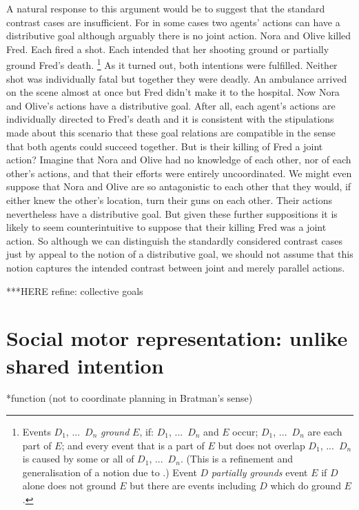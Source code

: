 \documentclass[12pt,\papersize]{extarticle}
\begin{document}
A natural response to this argument would be to suggest that the standard contrast cases are insufficient. 
For in some cases two agents' actions can have a distributive goal although arguably there is no joint action. 
Nora and Olive killed Fred.  
Each fired a shot.
Each intended that her shooting ground or partially ground Fred's death.%
\footnote{
Events $D_1$, ...\ $D_n$ \emph{ground} $E$, if: $D_1$, ...\ $D_n$ and $E$ occur; 
$D_1$, ...\ $D_n$ are each part of $E$; and 
every event that is 
	a part of $E$
	but does not overlap $D_1$, ...\ $D_n$ 
is caused by some or all of $D_1$, ...\ $D_n$.
(This is a refinement and generalisation of a notion due to \citet{pietroski_actions_1998}.)
Event $D$ \emph{partially grounds} event $E$ if $D$ alone does not ground $E$ but there are events including $D$ which do ground $E$.
} 
%
As it turned out, both intentions were fulfilled.
Neither shot was individually fatal but together they were deadly.
An ambulance arrived on the scene almost at once but Fred didn't make it to the hospital.
Now Nora and Olive's actions have a distributive goal.
After all, 
	each agent's actions are individually directed to Fred's death
	and  
	it is consistent with the stipulations made about this scenario that these goal relations are compatible in the sense that both agents could succeed together. 
But is their killing of Fred a joint action?
Imagine that Nora and Olive had no knowledge of each other, nor of each other's actions, and that their efforts were entirely uncoordinated.
We might even suppose that Nora and Olive are so antagonistic to each other that they would, if either knew the other's location, turn their guns on each other.
Their actions nevertheless have a distributive goal.
But given these further suppositions it is likely to seem counterintuitive to suppose that their killing Fred was a joint action. 
So although we can distinguish the standardly considered contrast cases just by appeal to the notion of a distributive goal, we should not assume that this notion captures the intended contrast between joint and merely parallel actions.

***HERE refine: collective goals



\section{Social motor representation: unlike shared intention}

*function (not to coordinate planning in Bratman's sense)
\end{document}
